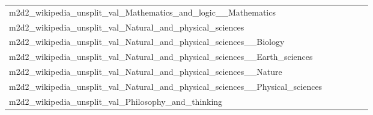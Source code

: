\documentclass[dvipsnames]{article}
\begin{document}
\begin{appendix}
{\begin{longtable}{m{6cm}m{1.7cm}m{1.7cm}m{1.7cm}m{1.7cm}m{1.7cm}}
	m2d2\_wikipedia\_unsplit\_val\_Mathematics\_and\_logic\_\_Mathematics  & \colorbox[HTML]{fcfed8}{\makebox[\mywidth][c]{12.90}} & \colorbox[HTML]{e0f2a8}{\makebox[\mywidth][c]{12.51}} & \colorbox[HTML]{ffffe5}{\makebox[\mywidth][c]{13.79}} & \colorbox[HTML]{d8efa2}{\makebox[\mywidth][c]{12.48}} & \colorbox[HTML]{77c578}{\makebox[\mywidth][c]{12.29}}\\
	m2d2\_wikipedia\_unsplit\_val\_Natural\_and\_physical\_sciences  & \colorbox[HTML]{ffffe5}{\makebox[\mywidth][c]{9.19}} & \colorbox[HTML]{f1f9b4}{\makebox[\mywidth][c]{8.22}} & \colorbox[HTML]{ffffe5}{\makebox[\mywidth][c]{8.81}} & \colorbox[HTML]{81c97c}{\makebox[\mywidth][c]{7.97}} & \colorbox[HTML]{77c578}{\makebox[\mywidth][c]{7.96}}\\
	m2d2\_wikipedia\_unsplit\_val\_Natural\_and\_physical\_sciences\_\_Biology  & \colorbox[HTML]{fdfedc}{\makebox[\mywidth][c]{10.97}} & \colorbox[HTML]{eaf7af}{\makebox[\mywidth][c]{10.70}} & \colorbox[HTML]{ffffe5}{\makebox[\mywidth][c]{11.53}} & \colorbox[HTML]{d4eea0}{\makebox[\mywidth][c]{10.64}} & \colorbox[HTML]{77c578}{\makebox[\mywidth][c]{10.51}}\\
	m2d2\_wikipedia\_unsplit\_val\_Natural\_and\_physical\_sciences\_\_Earth\_sciences  & \colorbox[HTML]{fefee0}{\makebox[\mywidth][c]{11.69}} & \colorbox[HTML]{f7fcbb}{\makebox[\mywidth][c]{11.36}} & \colorbox[HTML]{ffffe5}{\makebox[\mywidth][c]{12.28}} & \colorbox[HTML]{dbf1a4}{\makebox[\mywidth][c]{11.22}} & \colorbox[HTML]{77c578}{\makebox[\mywidth][c]{11.05}}\\
	m2d2\_wikipedia\_unsplit\_val\_Natural\_and\_physical\_sciences\_\_Nature  & \colorbox[HTML]{fefee2}{\makebox[\mywidth][c]{10.43}} & \colorbox[HTML]{f8fcbf}{\makebox[\mywidth][c]{10.11}} & \colorbox[HTML]{ffffe5}{\makebox[\mywidth][c]{10.95}} & \colorbox[HTML]{e4f4ab}{\makebox[\mywidth][c]{10.00}} & \colorbox[HTML]{77c578}{\makebox[\mywidth][c]{9.82}}\\
	m2d2\_wikipedia\_unsplit\_val\_Natural\_and\_physical\_sciences\_\_Physical\_sciences  & \colorbox[HTML]{fefee3}{\makebox[\mywidth][c]{11.48}} & \colorbox[HTML]{ebf7b0}{\makebox[\mywidth][c]{11.09}} & \colorbox[HTML]{ffffe5}{\makebox[\mywidth][c]{11.93}} & \colorbox[HTML]{bbe395}{\makebox[\mywidth][c]{10.98}} & \colorbox[HTML]{77c578}{\makebox[\mywidth][c]{10.90}}\\
	m2d2\_wikipedia\_unsplit\_val\_Philosophy\_and\_thinking  & \colorbox[HTML]{f6fbb8}{\makebox[\mywidth][c]{11.83}} & \colorbox[HTML]{e5f4ab}{\makebox[\mywidth][c]{11.72}} & \colorbox[HTML]{ffffe5}{\makebox[\mywidth][c]{13.04}} & \colorbox[HTML]{c3e698}{\makebox[\mywidth][c]{11.60}} & \colorbox[HTML]{77c578}{\makebox[\mywidth][c]{11.45}}\\

\end{longtable}}
\end{appendix}
\end{document}
